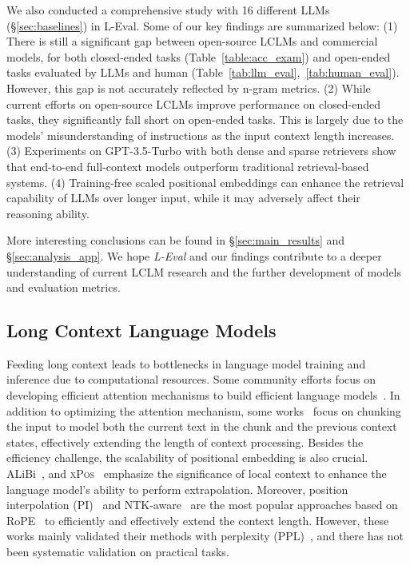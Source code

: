 We also conducted a comprehensive study with 16 different LLMs (\S\ref{sec:baselines}) in L-Eval. Some of our key findings are summarized below:
(1) There is still a significant gap between open-source LCLMs and commercial models, for both closed-ended tasks (Table~\ref{table:acc_exam}) and open-ended tasks evaluated by LLMs and human (Table~\ref{tab:llm_eval},~\ref{tab:human_eval}). However, this gap is not accurately reflected by n-gram metrics.
(2) While current efforts on open-source LCLMs improve performance on closed-ended tasks, they significantly fall short on open-ended tasks. This is largely due to the models' misunderstanding of instructions as the input context length increases.
(3) Experiments on GPT-3.5-Turbo with both dense and sparse retrievers show that end-to-end full-context models outperform traditional retrieval-based systems.
(4) Training-free scaled positional embeddings can enhance the retrieval capability of LLMs over longer input, while it may adversely affect their reasoning ability.
    

More interesting conclusions can be found in \S\ref{sec:main_results} and \S\ref{sec:analysis_app}. We hope \textit{L-Eval} and our findings contribute to a deeper understanding of current LCLM research and the further development of models and evaluation metrics.

\subsection{Long Context Language Models}\label{sec:lclms}
Feeding long context leads to bottlenecks in language model training and inference due to computational resources. Some community efforts focus on developing 
 {efficient attention} mechanisms to build efficient language models~\citep{sun2023retentive,ding2023longnet,li2023incontext,fu2023hungry,peng2023rwkv}. 
In addition to optimizing the attention mechanism, some works~\citep{bulatov2023scaling,dai-etal-2019-transformer, mohtashami2023landmark} focus on {chunking the input} to model both the current text in the chunk and the previous context states, effectively extending the length of context processing.
Besides the efficiency challenge, the {scalability of positional embedding} is also crucial. ALiBi~\citep{press2022train}, and \textsc{xPos}~\citep{sun2022lengthextrapolatable} emphasize the significance of local context to enhance the language model's ability to perform extrapolation.
Moreover, position interpolation (PI)~\citep{chen2023extending} and NTK-aware~\citep{fixedNTK, dynamicNTK} are the most popular approaches based on RoPE~\citep{su2022roformer} to efficiently and effectively extend the context length. However, these works mainly validated their methods with perplexity (PPL)~\citep{sun2021long, fixedNTK}, and there has not been systematic validation on practical tasks.  

